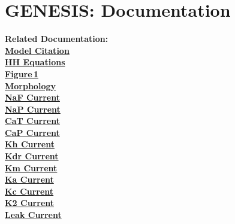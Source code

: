 \documentclass[12pt]{article}
\begin{document}
\section*{GENESIS: Documentation}

{\bf Related Documentation:}\\
\href{pub-purkinje-deschutter1-citation/pub-purkinje-deschutter1-citation.tex}{\bf Model Citation}\\
\href{pub-purkinje-deschutter1-equations1/pub-purkinje-deschutter1-equations1.tex}{\bf HH Equations}\\
\href{pub-purkinje-deschutter1-fig-1/pub-purkinje-deschutter1-fig-1.tex}{\bf Figure\,1}\\
\href{pub-purkinje-deschutter1-morphology/pub-purkinje-deschutter1-morphology.tex}{\bf Morphology}\\
\href{pub-purkinje-deschutter1-conductance1-naf1/pub-purkinje-deschutter1-conductance1-naf1.tex}{\bf NaF Current}\\
\href{pub-purkinje-deschutter1-conductance1-nap1/pub-purkinje-deschutter1-conductance1-nap1.tex}{\bf NaP Current}\\
\href{pub-purkinje-deschutter1-conductance1-cat1/pub-purkinje-deschutter1-conductance1-cat1.tex}{\bf CaT Current}\\
\href{pub-purkinje-deschutter1-conductance1-cap1/pub-purkinje-deschutter1-conductance1-cap1.tex}{\bf CaP Current}\\
\href{pub-purkinje-deschutter1-conductance1-kh1/pub-purkinje-deschutter1-conductance1-kh1.tex}{\bf Kh Current}\\
\href{pub-purkinje-deschutter1-conductance1-kdr1/pub-purkinje-deschutter1-conductance1-kdr1.tex}{\bf Kdr Current}\\
\href{pub-purkinje-deschutter1-conductance1-km1/pub-purkinje-deschutter1-conductance1-km1.tex}{\bf Km Current}\\
\href{pub-purkinje-deschutter1-conductance1-ka1/pub-purkinje-deschutter1-conductance1-ka1.tex}{\bf Ka Current}\\
\href{pub-purkinje-deschutter1-conductance1-kc1/pub-purkinje-deschutter1-conductance1-kc1.tex}{\bf Kc Current}\\
\href{pub-purkinje-deschutter1-conductance1-k2/pub-purkinje-deschutter1-conductance1-k2.tex}{\bf K2 Current}\\
\href{pub-purkinje-deschutter1-conductance1-leak1/pub-purkinje-deschutter1-conductance1-leak1.tex}{\bf Leak Current}\\
\end{document}
